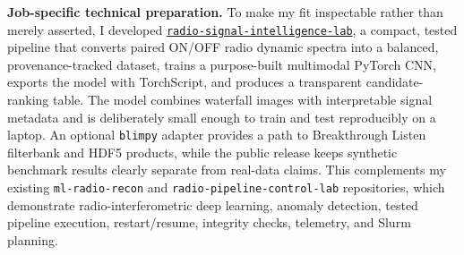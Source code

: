 \textbf{Job-specific technical preparation.}
To make my fit inspectable rather than merely asserted, I developed
\href{https://github.com/pkd-45/radio-signal-intelligence-lab}{\texttt{radio-signal-intelligence-lab}},
a compact, tested pipeline that converts paired ON/OFF radio dynamic spectra into a balanced, provenance-tracked dataset, trains a purpose-built multimodal PyTorch CNN, exports the model with TorchScript, and produces a transparent candidate-ranking table. The model combines waterfall images with interpretable signal metadata and is deliberately small enough to train and test reproducibly on a laptop. An optional \texttt{blimpy} adapter provides a path to Breakthrough Listen filterbank and HDF5 products, while the public release keeps synthetic benchmark results clearly separate from real-data claims. This complements my existing \texttt{ml-radio-recon} and \texttt{radio-pipeline-control-lab} repositories, which demonstrate radio-interferometric deep learning, anomaly detection, tested pipeline execution, restart/resume, integrity checks, telemetry, and Slurm planning.
